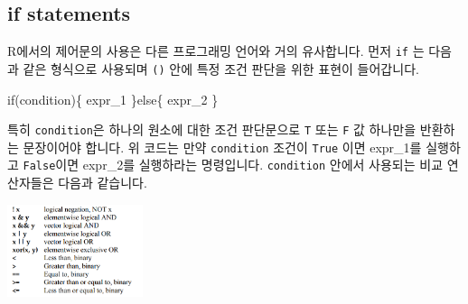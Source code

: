 \documentclass[
  a4paper,
]{book}
\newenvironment{Shaded}{\begin{snugshade}}{\end{snugshade}}
\newcommand{\ControlFlowTok}[1]{\textcolor[rgb]{0.00,0.23,0.31}{#1}}
\newcommand{\NormalTok}[1]{\textcolor[rgb]{0.00,0.23,0.31}{#1}}
\begin{document}
\hypertarget{if-statements}{%
\subsection{if statements}\label{if-statements}}

R에서의 제어문의 사용은 다른 프로그래밍 언어와 거의 유사합니다. 먼저
\texttt{if} 는 다음과 같은 형식으로 사용되며 \texttt{()} 안에 특정 조건
판단을 위한 표현이 들어갑니다.

\begin{Shaded}
\begin{Highlighting}[]
\ControlFlowTok{if}\NormalTok{(condition)\{}
\NormalTok{  expr\_1}
\NormalTok{\}}\ControlFlowTok{else}\NormalTok{\{}
\NormalTok{  expr\_2}
\NormalTok{\}}
\end{Highlighting}
\end{Shaded}

특히 \texttt{condition}은 하나의 원소에 대한 조건 판단문으로 \texttt{T}
또는 \texttt{F} 값 하나만을 반환하는 문장이어야 합니다. 위 코드는 만약
\texttt{condition} 조건이 \texttt{True} 이면 expr\_1를 실행하고
\texttt{False}이면 expr\_2를 실행하라는 명령입니다. \texttt{condition}
안에서 사용되는 비교 연산자들은 다음과 같습니다.

\includegraphics[width=1.5625in,height=\textheight]{images/04/01.PNG}
\end{document}
